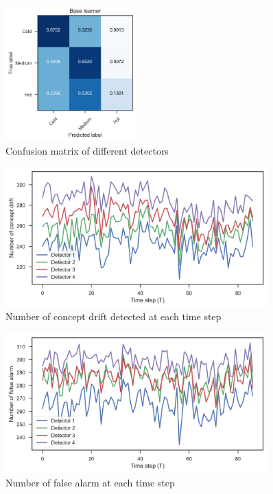 \begin{figure}
\includegraphics[width=0.45\textwidth]{drift_cm_Baselearner.png}
\caption{Confusion matrix of different detectors}
\label{drift_cm}
\end{figure}

\begin{figure}
\centering
\includegraphics[width=0.9\textwidth]{num_cd.png}
\caption{Number of concept drift detected at each time step}
\label{num_cd}
\end{figure}

\begin{figure}
\centering
\includegraphics[width=0.9\textwidth]{num_fa.png}
\caption{Number of false alarm at each time step}
\label{num_fa}
\end{figure}


